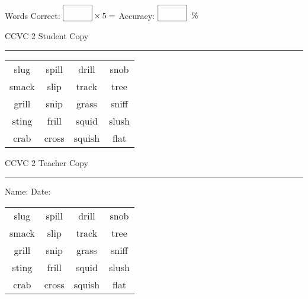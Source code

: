 \documentclass{memoir}
\begin{document}
\small

Words Correct: $\fbox{\phantom{\huge 100}} \times 5 = $ Accuracy: $\fbox{\phantom{\huge 100}}\;\; \%$ 

\vfill

\newpage


\footnotesize \noindent
CCVC 2 \hfill Student Copy
\smallskip
\hrule

\Large

\setlength{\tabcolsep}{14pt}
\def\arraystretch{3}

{\selectfont


\begin{vplace}[0.5]
\begin{center}
\begin{tabular}{cccc}
slug & spill & drill & snob \\
smack & slip & track       & tree \\
grill            & snip & grass                    & sniff \\
sting & frill & squid & slush \\
crab        & cross & squish & flat             \\
\end{tabular}
\end{center}
\end{vplace}

}

\newpage

\footnotesize \noindent
CCVC 2 \hfill Teacher Copy
\smallskip
\hrule

\small

\vfill

\noindent
Name: \underline{\hspace{1.75in}} \hfill Date: \underline{\hspace{1in}}

\Large

{\selectfont


\begin{vplace}[0.5]
\begin{center}
\begin{tabular}{cccc}
slug & spill & drill & snob \\
smack & slip & track       & tree \\
grill            & snip & grass                    & sniff \\
sting & frill & squid & slush \\
crab        & cross & squish & flat             \\
\end{tabular}
\end{center}
\end{vplace}



}
\end{document}
